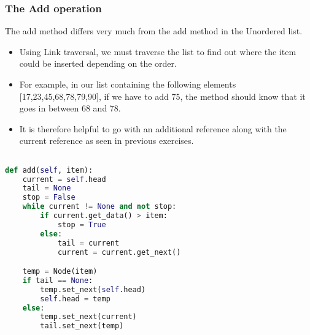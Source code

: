 \documentclass{beamer}
\begin{document}
\begin{frame}
\frametitle{The Add operation}
The add method differs very much from the add method in the Unordered list.

\begin{itemize}
\item Using Link traversal, we must traverse the list to find out where the item could be inserted depending on the order.

\item For example, in our list containing the following elements [17,23,45,68,78,79,90], if we have to add 75, the method should know that it goes in between 68 and 78.

\item It is therefore helpful to go with an additional reference along with the current reference as seen in previous exercises. 

\end{itemize}
\end{frame}
\begin{frame}[fragile]
\begin{lstlisting}[language=Python]

def add(self, item):
	current = self.head
	tail = None
	stop = False
	while current != None and not stop:
 		if current.get_data() > item:
 			stop = True
 		else:
			tail = current
			current = current.get_next()

	temp = Node(item)
	if tail == None:
		temp.set_next(self.head)
		self.head = temp
	else:
		temp.set_next(current)
		tail.set_next(temp)
\end{lstlisting}
\end{frame}
\end{document}
